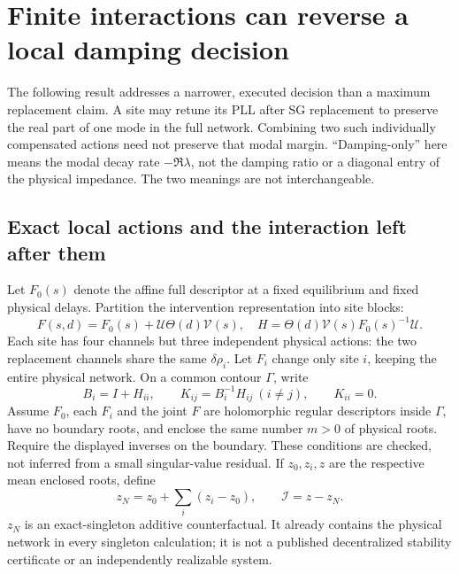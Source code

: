 \section{Finite interactions can reverse a local damping decision}
\label{sec:decision}
The following result addresses a narrower, executed decision than a maximum
replacement claim. A site may retune its PLL after SG replacement to preserve
the real part of one mode in the full network. Combining two such individually
compensated actions need not preserve that modal margin. ``Damping-only'' here
means the modal decay rate $-\Re\lambda$, not the damping ratio or a diagonal
entry of the physical impedance. The two meanings are not interchangeable.

\subsection{Exact local actions and the interaction left after them}
Let $F_0(s)$ denote the affine full descriptor at a fixed equilibrium and fixed
physical delays. Partition the intervention representation into site blocks:
\begin{equation}
 F(s,d)=F_0(s)+\mathcal U\Theta(d)\mathcal V(s),\quad
 H=\Theta(d)\mathcal V(s)F_0(s)^{-1}\mathcal U .
\end{equation}
Each site has four channels but three independent physical actions: the two
replacement channels share the same $\delta\rho_i$. Let $F_i$ change only
site $i$, keeping the entire physical network. On a common contour $\Gamma$,
write
\begin{equation}
 B_i=I+H_{ii},\qquad K_{ij}=B_i^{-1}H_{ij}\ (i\ne j),\qquad K_{ii}=0.
\end{equation}
Assume $F_0$, each $F_i$ and the joint $F$ are holomorphic regular descriptors
inside $\Gamma$, have no boundary roots, and enclose the same number $m>0$ of
physical roots. Require the displayed inverses on the boundary. These
conditions are checked, not inferred from a small singular-value residual.
If $z_0,z_i,z$ are the respective mean enclosed roots, define
\begin{equation}
 z_N=z_0+\sum_i(z_i-z_0),\qquad \mathcal I=z-z_N .
 \label{eq:singleton-counterfactual}
\end{equation}
$z_N$ is an exact-singleton additive counterfactual. It already contains the
physical network in every singleton calculation; it is not a published
decentralized stability certificate or an independently realizable system.

